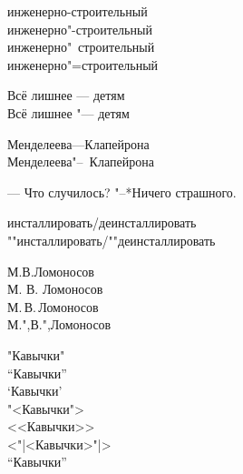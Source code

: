 \documentclass{article}
\begin{document}
\begin{boxedminipage}{1.8cm}
инженерно-строительный\\
инженерно"-строительный\\
инженерно"~строительный\\
инженерно"=строительный
\end{boxedminipage}

\begin{boxedminipage}{2.2cm}
Всё лишнее --- детям\\
Всё лишнее "--- детям
\end{boxedminipage}

\begin{boxedminipage}{2cm}
Менделеева---Клапейрона\\
Менделеева"--~Клапейрона
\end{boxedminipage}

\begin{boxedminipage}{2.2cm}
--- Что случилось?
"--*Ничего страшного.
\end{boxedminipage}

\begin{boxedminipage}{2.2cm}
инсталлировать/деинсталлировать\\
""инсталлировать/""деинсталлировать
\end{boxedminipage}

\begin{boxedminipage}{2cm}
М.В.Ломоносов\\
М. В. Ломоносов\\
М.\,В.\,Ломоносов\\
М.",В.",Ломоносов
\end{boxedminipage}

\begin{boxedminipage}{3cm}
"Кавычки"\\
``Кавычки''\\
`Кавычки'\\
"<Кавычки">\\
<<Кавычки>>\\
<"|<Кавычки>"|>\\
"`Кавычки"'
\end{boxedminipage}
\end{document}
